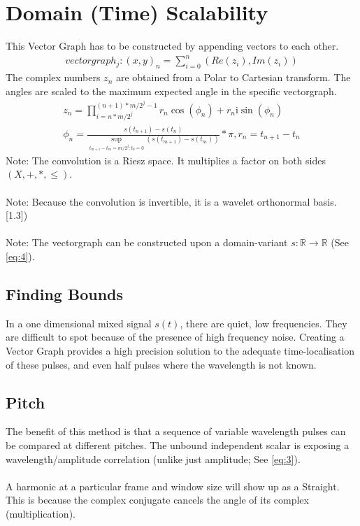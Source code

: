 \documentclass{report}
\begin{document}
\section{Domain (Time) Scalability}
This Vector Graph has to be constructed by appending vectors to each other.
\begin{align}
vectorgraph_{j}: (x,y)_{n}=\sum \limits _{i=0}^{n}(Re(z_{i}),Im(z_{i}))
\end{align}
The complex numbers $z_{n}$ are obtained from a Polar to Cartesian transform. The angles are scaled to the maximum expected angle in the specific vectorgraph.
\begin{align}
z_{n}=\prod \limits _{i=n*m/2^j}^{(n+1)*m/2^j-1}r_{n}\cos(\phi_{n})+r_{n}\mathrm{i}\sin(\phi_{n})\\
\phi_{n}=\frac{s(t_{n+1})-s(t_{n})}{\sup \limits _{t_{m+1}-t_{m}=m/2^j;t_{0}=0}(s(t_{m+1})-s(t_{m}))}*\pi,r_{n}=t_{n+1}-t_{n}
\end{align}
Note: The convolution is a Riesz space. It multiplies a factor on both sides $(X,+,*,\leq)$.\\\\
Note: Because the convolution is invertible, it is a wavelet orthonormal basis. \cite{Mallat}[1.3])\\\\
Note: The vectorgraph can be constructed upon a domain-variant $s: \mathbb{R} \rightarrow \mathbb{R}$ (See \eqref{eq:4}).
\subsection{Finding Bounds}
In a one dimensional mixed signal $s(t)$, there are quiet, low frequencies. They are difficult to spot because of the presence of high frequency noise. Creating a Vector Graph provides a high precision solution to the adequate time-localisation of these pulses, and even half pulses where the wavelength is not known.
\subsection{Pitch}
The benefit of this method is that a sequence of variable wavelength pulses can be compared at different pitches. The unbound independent scalar is exposing a wavelength/amplitude correlation (unlike just amplitude; See \eqref{eq:3}).\\\\
A harmonic at a particular frame and window size will show up as a Straight. This is because the complex conjugate cancels the angle of its complex (multiplication).
\end{document}
